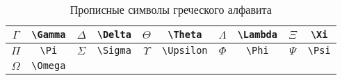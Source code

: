 \begin{table}
	\begin{tabular}{|c|c||c|c||c|c||c|c||c|c|}
		\hline $\Gamma$ & \Verb|\Gamma| 
		& $\Delta$ & \Verb|\Delta| 
		& $\Theta$ & \Verb|\Theta| 
		& $\Lambda$ & \Verb|\Lambda| 
		& $\Xi$ & \Verb|\Xi| \\
		\hline $\Pi$ & \Verb|\Pi| 
		& $\Sigma$ & \Verb|\Sigma| 
		& $\Upsilon$ & \Verb|\Upsilon| 
		& $\Phi$ & \Verb|\Phi| 
		& $\Psi$ & \Verb|\Psi| \\
		\hline $\Omega$ & \Verb|\Omega| 
		&&&&&&&&\\
		\hline
	\end{tabular}
	\caption{Прописные символы греческого алфавита}
\end{table}